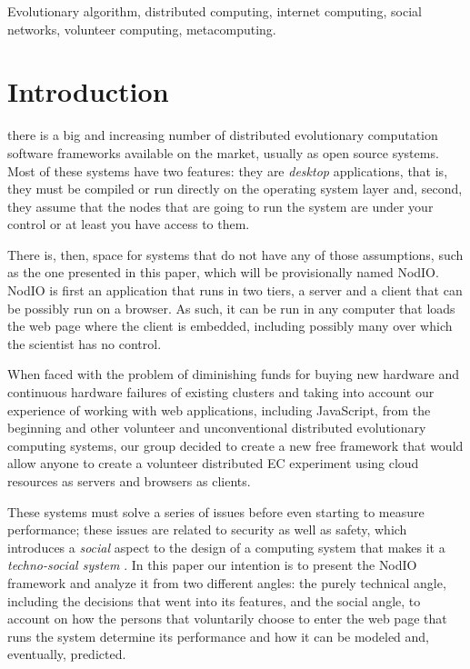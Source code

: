 \documentclass[journal,onecolumn]{IEEEtran}
\begin{document}
\begin{IEEEkeywords}
Evolutionary algorithm, distributed computing, internet computing,
social networks, volunteer computing, metacomputing. 
\end{IEEEkeywords}


\section{Introduction}

 there is a big and increasing number of
distributed evolutionary computation software frameworks available on
the market, usually as open source systems. Most of these systems have
two features: they are {\em desktop} applications, that is, they must
be compiled or run directly on the operating system layer and, second,
they assume that the nodes that are going to run the system are under
your control or at least you have access to them.

There is, then, space for systems that do not have any of those
assumptions, such as the one presented in this paper, which will be
provisionally named {\sf NodIO}. NodIO is first an application that
runs in two tiers, a server and a client that can be possibly run on a  %
browser. As such, it can be run in any computer that loads the web
page where the client is embedded, including possibly many over which
the scientist has no control. 

When faced with the problem of diminishing funds for buying new     %
hardware and continuous hardware failures of existing clusters and
taking into account our experience of working with web applications,
including JavaScript, from the beginning and other volunteer and
unconventional distributed evolutionary computing systems, our group
decided to create a new free framework that would allow anyone to
create a volunteer distributed EC experiment using cloud resources as
servers and browsers as clients. 

These systems must solve a series of issues before even starting to
measure performance; these issues are related to security as well as
safety, which introduces a {\em social} aspect to the design of a
computing system that makes it a {\em techno-social system}
\cite{vespignani2009predicting}. In this paper our intention is to
present the {\sf NodIO} framework and analyze it from two different
angles: the purely technical angle, including the decisions that went
into its features, and the social angle, to account on how the persons
that voluntarily choose to enter the web page that runs the system
determine its performance and how it can be modeled and, eventually,
predicted.
\end{document}
